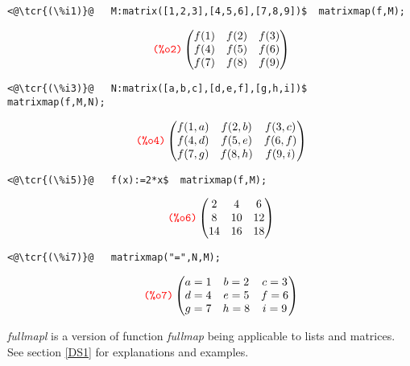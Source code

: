 \documentclass[../Maxima_Workbook.tex]{subfiles}
\begin{document}
\lz \begin{small}
\color{blue}
\begin{lstlisting}
<@\tcr{(\%i1)}@   M:matrix([1,2,3],[4,5,6],[7,8,9])$  matrixmap(f,M);
\end{lstlisting}
\vspace{-3.5mm} \[\tag*{\tcr{\ttfamily (\%o2)}} \begin{pmatrix} f(1) & f(2) & f(3) \\ f(4) & f(5) & f(6) \\ f(7) & f(8) & f(9) \end{pmatrix} \]
\vspace{-4mm}\begin{lstlisting}
<@\tcr{(\%i3)}@   N:matrix([a,b,c],[d,e,f],[g,h,i])$  matrixmap(f,M,N);
\end{lstlisting}
\vspace{-3.5mm} \[\tag*{\tcr{\ttfamily (\%o4)}} \begin{pmatrix} f(1,a) & f(2,b) & f(3,c) \\ f(4,d) & f(5,e) & f(6,f) \\ f(7,g) & f(8,h) & f(9,i) \end{pmatrix} \]
\vspace{-4mm}\begin{lstlisting}
<@\tcr{(\%i5)}@   f(x):=2*x$  matrixmap(f,M);
\end{lstlisting}
\vspace{-3.5mm} \[\tag*{\tcr{\ttfamily (\%o6)}} \begin{pmatrix} 2 & 4 & 6 \\ 8 & 10 & 12 \\ 14 & 16 & 18 \end{pmatrix} \]
\vspace{-4mm}\begin{lstlisting}
<@\tcr{(\%i7)}@   matrixmap("=",N,M);
\end{lstlisting}
\vspace{-3.5mm} \[\tag*{\tcr{\ttfamily (\%o7)}} \begin{pmatrix} a=1 & b=2 & c=3 \\ d=4 & e=5 & f=6 \\ g=7 & h=8 & i=9 \end{pmatrix} \]
\color{black}
\end{small}

\lz {} \hfill \tcr{[function]}

\lz \emph{fullmapl} is a version of function \emph{fullmap} being applicable to lists and matrices. See section \ref{DS1} for explanations and examples.
\end{document}
